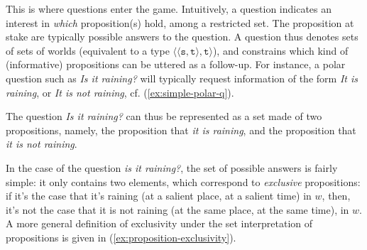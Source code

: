 This is where questions enter the game. Intuitively, a question indicates an interest in \textit{which} proposition(s) hold, among a restricted set. The proposition at stake are typically possible answers to the question. A question thus denotes sets of sets of worlds (equivalent to a type $\langle\langle \texttt{s}, \texttt{t}\rangle, \texttt{t}\rangle$), and constrains which kind of (informative) propositions can be uttered as a follow-up. For instance, a polar question such as \textit{Is it raining?} will typically request information of the form \textit{It is raining}, or \textit{It is not raining}, cf. (\ref{ex:simple-polar-q}). 

\begin{exe}
	\label{ex:simple-polar-q}
\end{exe} 

The question \textit{Is it raining?} can thus be represented as a set made of two propositions, namely, the proposition that \textit{it is raining}, and the proposition that \textit{it is not raining}.  

\begin{exe}
\end{exe}

In the case of the question \textit{is it raining?}, the set of possible answers is fairly simple: it only contains two elements, which correspond to \textit{exclusive} propositions: if it's the case that it's raining (at a salient place, at a salient time) in $w$, then, it's not the case that it is not raining (at the same place, at the same time), in $w$. A more general definition of exclusivity under the set interpretation of propositions is given in (\ref{ex:proposition-exclusivity}).

\begin{exe}
	\label{ex:proposition-exclusivity}
\end{exe}


